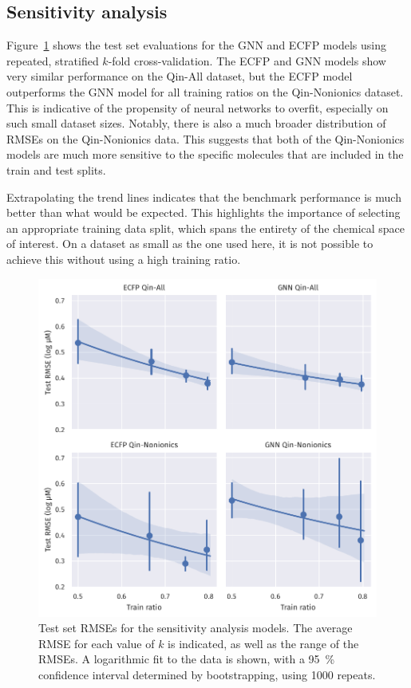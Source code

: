 \subsection{Sensitivity analysis}

Figure~\ref{fig:sensitivity} shows the test set evaluations for the GNN and ECFP
models using repeated, stratified $k$-fold cross-validation. The ECFP and GNN
models show very similar performance on the Qin-All dataset, but the ECFP model
outperforms the GNN model for all training ratios on the Qin-Nonionics dataset.
This is indicative of the propensity of neural networks to overfit, especially
on such small dataset sizes. Notably, there is also a much broader distribution
of RMSEs on the Qin-Nonionics data. This suggests that both of the Qin-Nonionics
models are much more sensitive to the specific molecules that are included in
the train and test splits.

Extrapolating the trend lines indicates that the benchmark performance is much
better than what would be expected. This highlights the importance of selecting
an appropriate training data split, which spans the entirety of the chemical
space of interest. On a dataset as small as the one used here, it is not
possible to achieve this without using a high training ratio.

\begin{figure}
    \includegraphics[width=\textwidth]{images/sensitivity-plots.pdf}
    \caption{Test set RMSEs for the sensitivity analysis models. The average
        RMSE for each value of $k$ is indicated, as well as the range of the RMSEs.
        A logarithmic fit to the data is shown, with a \SI{95}{\%} confidence
        interval determined by bootstrapping, using \num{1000} repeats.}
    \label{fig:sensitivity}
\end{figure}